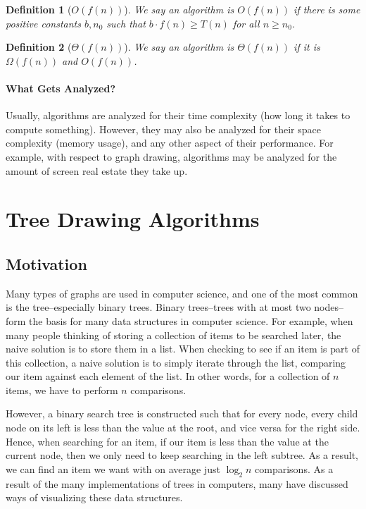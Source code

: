 \documentclass[11pt]{report}
\newtheorem{defn}{Definition}[section]
\begin{document}
\begin{defn}[$O(f(n))$] We say an algorithm is $O(f(n))$ if there is some positive constants $b, n_0$ such that $b \cdot f(n) \geq T(n)$ for all $n \geq n_0$.
\end{defn}

\begin{defn}[$\Theta(f(n))$] We say an algorithm is $\Theta(f(n))$ if it is $\Omega(f(n))$ and $O(f(n))$.
\end{defn}

\subsubsection{What Gets Analyzed?}
Usually, algorithms are analyzed for their time complexity (how long it takes to compute something). However, they may also be analyzed for their space complexity (memory usage), and any other aspect of their performance. For example, with respect to graph drawing, algorithms may be analyzed for the amount of screen real estate they take up.

\chapter{Tree Drawing Algorithms}
\section{Motivation}
Many types of graphs are used in computer science, and one of the most common is the tree--especially binary trees. Binary trees--trees with at most two nodes--form the basis for many data structures in computer science. For example, when many people thinking of storing a collection of items to be searched later, the naive solution is to store them in a list. When checking to see if an item is part of this collection, a naive solution is to simply iterate through the list, comparing our item against each element of the list. In other words, for a collection of $n$ items, we have to perform $n$ comparisons.

\bigskip

However, a binary search tree is constructed such that for every node, every child node on its left is less than the value at the root, and vice versa for the right side. Hence, when searching for an item, if our item is less than the value at the current node, then we only need to keep searching in the left subtree. As a result, we can find an item we want with on average just $\log_2{n}$ comparisons. As a result of the many implementations of trees in computers, many have discussed ways of visualizing these data structures.
\end{document}

